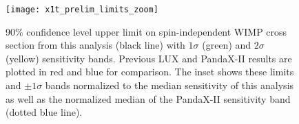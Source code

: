 \begin{figure}
\centering
\texttt{[image: x1t\_prelim\_limits\_zoom]}
\caption{90\% confidence level upper limit on spin-independent WIMP cross section from this analysis (black line) with $1\sigma$ (green)
and $2\sigma$ (yellow) sensitivity bands.  Previous LUX  and PandaX-II  results are plotted in
red and blue for comparison.  The inset shows these limits and $\pm 1\sigma$ bands normalized to the median sensitivity of this
analysis as well as the normalized median of the PandaX-II sensitivity band (dotted blue line).}
\label{fig:dark_matter_results_background_limit}
\end{figure}